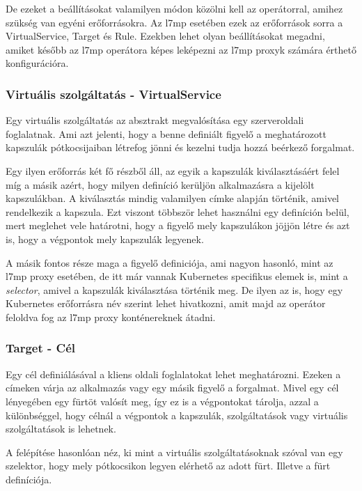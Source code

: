 De ezeket a beállításokat valamilyen módon közölni kell az operátorral, amihez 
szükség van egyéni erőforrásokra. Az l7mp esetében ezek az erőforrások sorra a 
VirtualService, Target és Rule. Ezekben lehet olyan beállításokat megadni, amiket
később az l7mp operátora képes leképezni az l7mp proxyk számára érthető konfigurációra.

\subsubsection{Virtuális szolgáltatás - VirtualService}

Egy virtuális szolgáltatás az absztrakt megvalósítása egy szerveroldali foglalatnak. 
Ami azt jelenti, hogy a benne definiált figyelő a meghatározott kapszulák pótkocsijaiban 
létrefog jönni és kezelni tudja hozzá beérkező forgalmat. 

Egy ilyen erőforrás két fő részből áll, az egyik a kapszulák kiválasztásáért felel míg
a másik azért, hogy milyen definíció kerüljön alkalmazásra a kijelölt kapszulákban.
A kiválasztás mindig valamilyen címke alapján történik, amivel rendelkezik a kapszula. 
Ezt viszont többször lehet használni egy definíción belül, mert meglehet vele határotni,
hogy a figyelő mely kapszulákon jöjjön létre és azt is, hogy a végpontok mely kapszulák 
legyenek. 

A másik fontos része maga a figyelő definiciója, ami nagyon hasonló, mint az l7mp proxy
esetében, de itt már vannak Kubernetes specifikus elemek is, mint a \textit{selector},
amivel a kapszulák kiválasztása történik meg. De ilyen az is, hogy egy Kubernetes 
erőforrásra név szerint lehet hivatkozni, amit majd az operátor feloldva fog az l7mp
proxy konténereknek átadni.

\subsubsection{Target - Cél}

Egy cél definiálásával a kliens oldali foglalatokat lehet meghatározni. Ezeken 
a címeken várja az alkalmazás vagy egy másik figyelő a forgalmat. Mivel egy cél 
lényegében egy fürtöt valósít meg, így ez is a végpontokat tárolja, azzal a különbséggel,
hogy célnál a végpontok a kapszulák, szolgáltatások vagy virtuális szolgáltatások is 
lehetnek. 

A felépítése hasonlóan néz, ki mint a virtuális szolgáltatásoknak szóval van egy 
szelektor, hogy mely pótkocsikon legyen elérhető az adott fürt. Illetve a fürt
definíciója. 

